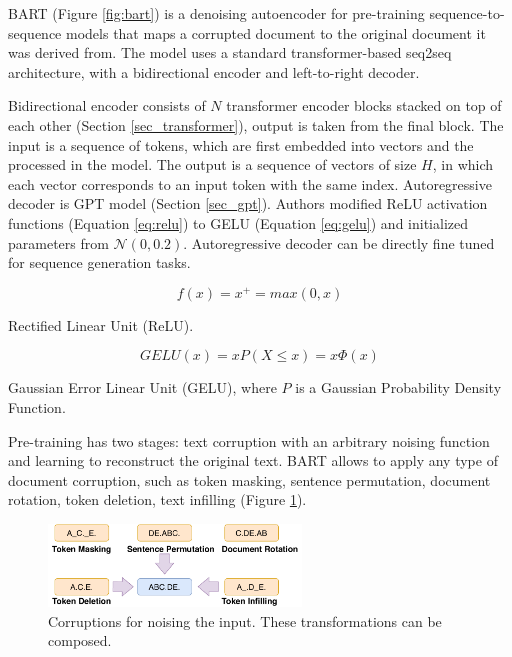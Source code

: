 BART (Figure \ref{fig:bart}) is a denoising autoencoder for pre-training sequence-to-sequence models that maps a corrupted document to the original document it was derived from. The model uses a standard transformer-based seq2seq architecture, with a bidirectional encoder and left-to-right decoder.

Bidirectional encoder consists of $N$ transformer encoder blocks stacked on top of each other (Section \ref{sec_transformer}), output is taken from the final block. The input is a sequence of tokens, which are first embedded into vectors and the processed in the model. The output is a sequence of vectors of size $H$, in which each vector corresponds to an input token with the same index. Autoregressive decoder is GPT model (Section \ref{sec_gpt}). Authors modified ReLU activation functions (Equation \ref{eq:relu}) to GELU (Equation \ref{eq:gelu}) and initialized parameters from $\mathcal{N}(0, 0.2)$. Autoregressive decoder can be directly fine tuned for sequence generation tasks.

\begin{eqfloat} [H]
\begin{equation} \label{eq:relu}
f(x) = x^+ = max(0, x)
\end{equation}
\caption{Rectified Linear Unit (ReLU).}
\end{eqfloat}
\begin{eqfloat} [H]
\begin{equation} \label{eq:gelu}
GELU(x) = xP(X \leq x) = x \Phi(x)
\end{equation}
\caption{Gaussian Error Linear Unit (GELU), where $P$ is a Gaussian Probability Density Function.}
\end{eqfloat}

Pre-training has two stages: text corruption with an arbitrary noising function and learning to reconstruct the original text. BART allows to apply any type of document corruption, such as token masking, sentence permutation, document rotation, token deletion, text infilling (Figure \ref{fig:bart_doc_corruption}).

\begin{figure}[hbt]
  \centering
  \includegraphics[width=0.6\textwidth]{figures/bart_doc_corruptions.pdf}
  \caption{Corruptions for noising the input. These transformations can be composed.}
  \label{fig:bart_doc_corruption}
\end{figure}

